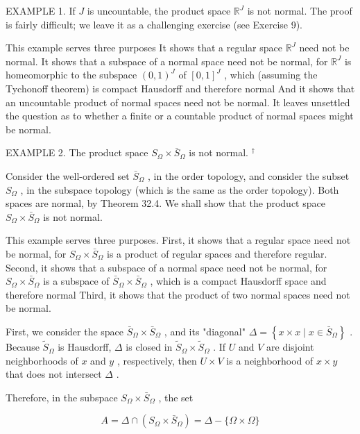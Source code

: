 EXAMPLE 1. If \(J\) is uncountable, the product space \({\mathbb{R}}^{J}\) is not normal. The proof is fairly difficult; we leave it as a challenging exercise (see Exercise 9).

This example serves three purposes It shows that a regular space \({\mathbb{R}}^{J}\) need not be normal. It shows that a subspace of a normal space need not be normal, for \({\mathbb{R}}^{J}\) is homeomorphic to the subspace \({\left( 0,1\right) }^{J}\) of \({\left\lbrack  0,1\right\rbrack  }^{J}\) , which (assuming the Tychonoff theorem) is compact Hausdorff and therefore normal And it shows that an uncountable product of normal spaces need not be normal. It leaves unsettled the question as to whether a finite or a countable product of normal spaces might be normal.

EXAMPLE 2. The product space \({S}_{\Omega } \times  {\bar{S}}_{\Omega }\) is not normal. \({}^{ \dagger  }\)

Consider the well-ordered set \({\bar{S}}_{\Omega }\) , in the order topology, and consider the subset \({S}_{\Omega }\) , in the subspace topology (which is the same as the order topology). Both spaces are normal, by Theorem 32.4. We shall show that the product space \({S}_{\Omega } \times  {\bar{S}}_{\Omega }\) is not normal.

This example serves three purposes. First, it shows that a regular space need not be normal, for \({S}_{\Omega } \times  {\bar{S}}_{\Omega }\) is a product of regular spaces and therefore regular. Second, it shows that a subspace of a normal space need not be normal, for \({S}_{\Omega } \times  {\bar{S}}_{\Omega }\) is a subspace of \({\bar{S}}_{\Omega } \times  {\bar{S}}_{\Omega }\) , which is a compact Hausdorff space and therefore normal Third, it shows that the product of two normal spaces need not be normal.

First, we consider the space \({\bar{S}}_{\Omega } \times  {\bar{S}}_{\Omega }\) , and its "diagonal" \(\Delta  = \left\{  {x \times  x \mid  x \in  {\bar{S}}_{\Omega }}\right\}\) . Because \({\widetilde{S}}_{\Omega }\) is Hausdorff, \(\Delta\) is closed in \({\widetilde{S}}_{\Omega } \times  {\widetilde{S}}_{\Omega }\) . If \(U\) and \(V\) are disjoint neighborhoods of \(x\) and \(y\) , respectively, then \(U \times  V\) is a neighborhood of \(x \times  y\) that does not intersect \(\Delta\) .

Therefore, in the subspace \({S}_{\Omega } \times  {\bar{S}}_{\Omega }\) , the set

\[
A = \Delta  \cap  \left( {{S}_{\Omega } \times  {\bar{S}}_{\Omega }}\right)  = \Delta  - \{ \Omega  \times  \Omega \}
\]

